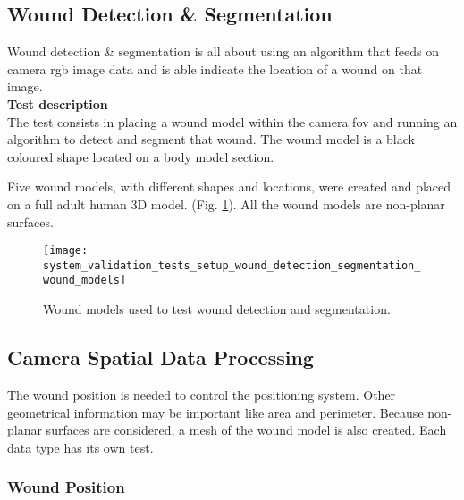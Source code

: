 \subsection{Wound Detection \& Segmentation}
\label{subsec:system_validation_tests_setup_wound_detection_segmentation}

Wound detection \& segmentation is all about using an algorithm that feeds on camera \gls{rgb} image data and is able indicate the location of a wound on that image.\\

\textbf{Test description}\\
The test consists in placing a wound model within the camera \gls{fov} and running an algorithm to detect and segment that wound. The wound model is a black coloured shape located on a body model section.

Five wound models, with different shapes and locations, were created and placed on a full adult human 3D model. (Fig. \ref{fig:system_validation_tests_setup_wound_detection_segmentation_wound_models}). All the wound models are non-planar surfaces. 

\begin{figure}[htbp]
	\centering
	\texttt{[image: system\_validation\_tests\_setup\_wound\_detection\_segmentation\_wound\_models]}
	\caption[Wound models used to test wound detection and segmentation.]{Wound models used to test wound detection and segmentation.}
	\label{fig:system_validation_tests_setup_wound_detection_segmentation_wound_models}
\end{figure}


\subsection{Camera Spatial Data Processing}
\label{subsec:system_validation_tests_setup_camera_spatial_data_processing}

The wound position is needed to control the positioning system. Other geometrical information may be important like area and perimeter. Because non-planar surfaces are considered, a mesh of the wound model is also created. Each data type has its own test.

\subsubsection*{Wound Position}
\label{subsubsec:system_validation_tests_setup_camera_spatial_data_processing_position}

